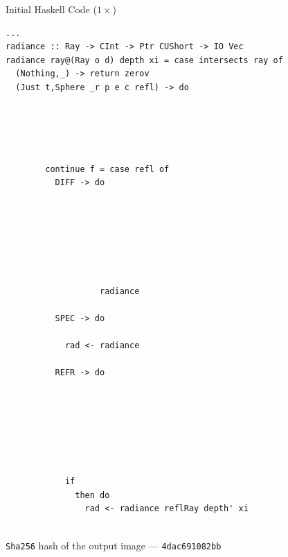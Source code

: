 \documentclass[8pt]{beamer}
\newcommand{\raw}[1]{\texttt{#1}}
\begin{document}
\begin{frame}[fragile]{Initial Haskell Code ($1\times$)}
\begin{verbatim}
...
radiance :: Ray -> CInt -> Ptr CUShort -> IO Vec
radiance ray@(Ray o d) depth xi = case intersects ray of
  (Nothing,_) -> return zerov
  (Just t,Sphere _r p e c refl) -> do
                                        
                                   
                                                              
                         
                                
        continue f = case refl of
          DIFF -> do
                                                
                               
                                
                                      
                                                                                           
                                  
                                                                                                                
                   radiance 
                                            
          SPEC -> do
                                                         
            rad <- radiance 
                                            
          REFR -> do
                                                                                                     
                                                                                   
                         
                           
                                                      
                                
                                                
            if 
              then do
                rad <- radiance reflRay depth' xi
                                                
\end{verbatim}
\raw{Sha256} hash of the output image --- \raw{4dac691082bb}
\end{frame}
\end{document}
